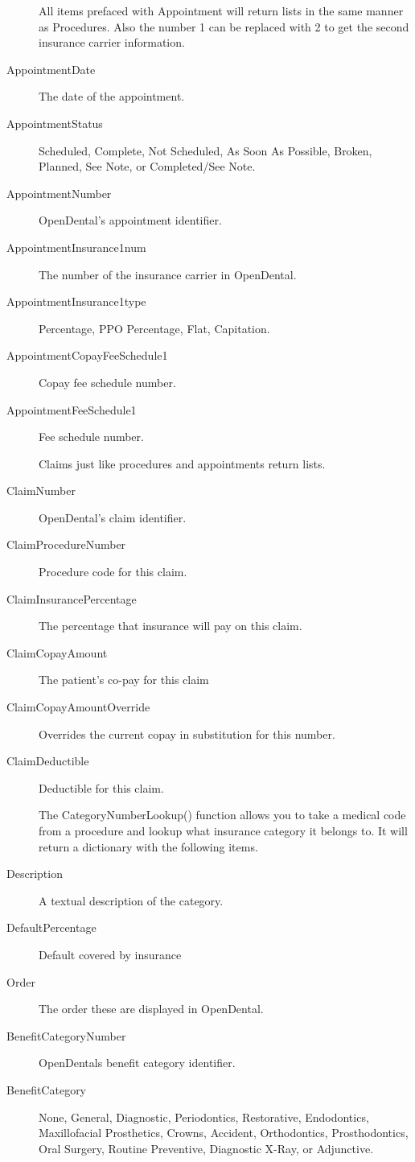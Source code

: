 \documentclass[10pt,a4paper]{article}
\begin{document}
\begin{description}
\begin{center}
All items prefaced with Appointment will return lists in the same manner as Procedures. Also the number 1 can be replaced with 2 to get the second insurance carrier information.
\end{center}

\item[AppointmentDate] The date of the appointment. 
\item[AppointmentStatus] Scheduled, Complete, Not Scheduled, As Soon As Possible, Broken, Planned, See Note, or Completed/See Note.
\item[AppointmentNumber] OpenDental's appointment identifier. 
\item[AppointmentInsurance1num] The number of the insurance carrier in OpenDental.
\item[AppointmentInsurance1type] Percentage, PPO Percentage, Flat, Capitation. 
\item[AppointmentCopayFeeSchedule1] Copay fee schedule number.
\item[AppointmentFeeSchedule1] Fee schedule number.

\begin{center}
Claims just like procedures and appointments return lists. 
\end{center}

\item[ClaimNumber] OpenDental's claim identifier.
\item[ClaimProcedureNumber] Procedure code for this claim.
\item[ClaimInsurancePercentage] The percentage that insurance will pay on this claim.
\item[ClaimCopayAmount] The patient's co-pay for this claim
\item[ClaimCopayAmountOverride] Overrides the current copay in substitution for this number.
\item[ClaimDeductible] Deductible for this claim. 

\begin{center}
The CategoryNumberLookup() function allows you to take a medical code from a procedure and lookup what insurance category it belongs to. It will return a dictionary with the following items.  
\end{center} 
\item[Description] A textual description of the category.
\item[DefaultPercentage] Default covered by insurance
\item[Order] The order these are displayed in OpenDental.
\item[BenefitCategoryNumber] OpenDentals benefit category identifier.
\item[BenefitCategory] None, General, Diagnostic, Periodontics, Restorative, Endodontics, Maxillofacial Prosthetics, Crowns, Accident, Orthodontics, Prosthodontics, Oral Surgery, Routine Preventive, Diagnostic X-Ray, or Adjunctive. 


\end{description}
\end{document}
